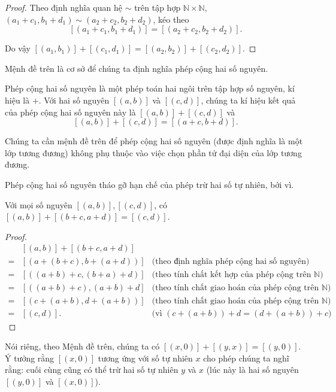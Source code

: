 \begin{proof}
	Theo định nghĩa quan hệ $\sim$ trên tập hợp $\mathbb{N}\times\mathbb{N}$, $(a_{1}+c_{1}, b_{1}+d_{1}) \sim (a_{2}+c_{2}, b_{2}+d_{2})$, kéo theo
	\[
		[(a_{1}+c_{1}, b_{1}+d_{1})] = [(a_{2}+c_{2}, b_{2}+d_{2})].
	\]

	Do vậy $[(a_{1}, b_{1})] + [(c_{1}, d_{1})] = [(a_{2}, b_{2})] + [(c_{2}, d_{2})]$.
\end{proof}

Mệnh đề trên là cơ sở để chúng ta định nghĩa phép cộng hai số nguyên.
\begin{definition}
	Phép cộng hai số nguyên là một phép toán hai ngôi trên tập hợp số nguyên, kí hiệu là $+$. Với hai số nguyên $[(a, b)]$ và $[(c, d)]$, chúng ta kí hiệu kết quả của phép cộng hai số nguyên này là $[(a, b)] + [(c, d)]$ và
	\[
		[(a, b)] + [(c, d)] = [(a+c, b+d)].
	\]
\end{definition}

Chúng ta cần mệnh đề trên để phép cộng hai số nguyên (được định nghĩa là một lớp tương đương) không phụ thuộc vào việc chọn phần tử đại diện của lớp tương đương.

Phép cộng hai số nguyên tháo gỡ hạn chế của phép trừ hai số tự nhiên, bởi vì.
\begin{proposition}
	Với mọi số nguyên $[(a, b)], [(c, d)]$, có $[(a, b)] + [(b+c, a+d)] = [(c, d)]$.
\end{proposition}

\begin{proof}
	\begin{align*}
		  & [(a, b)] + [(b+c, a+d)]                                                                     \\
		= & [(a+(b+c), b+(a+d))]    & \text{(theo định nghĩa phép cộng hai số nguyên)}                  \\
		= & [((a+b)+c, (b+a)+d)]    & \text{(theo tính chất kết hợp của phép cộng trên $\mathbb{N}$)}   \\
		= & [((a+b)+c), (a+b)+d]    & \text{(theo tính chất giao hoán của phép cộng trên $\mathbb{N}$)} \\
		= & [(c+(a+b), d+(a+b))]    & \text{(theo tính chất giao hoán của phép cộng trên $\mathbb{N}$)} \\
		= & [(c, d)].               & \text{(vì $(c+(a+b))+d = (d+(a+b))+c$)}
	\end{align*}
\end{proof}

Nói riêng, theo Mệnh đề trên, chúng ta có $[(x, 0)] + [(y, x)] = [(y, 0)]$. Ý tưởng rằng $[(x, 0)]$ tương ứng với số tự nhiên $x$ cho phép chúng ta nghĩ rằng: cuối cùng cũng có thể trừ hai số tự nhiên $y$ và $x$ (lúc này là hai số nguyên $[(y, 0)]$ và $[(x, 0)]$).

